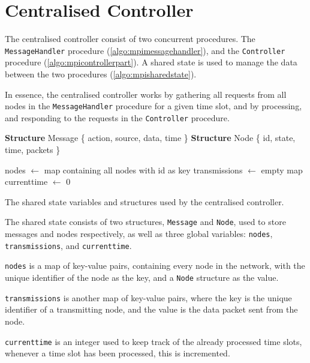 \section{Centralised Controller}\label{sec:mpicontroller}
The centralised controller consist of two concurrent procedures. The \texttt{MessageHandler} procedure (\autoref{algo:mpimessagehandler}), and the \texttt{Controller} procedure (\autoref{algo:mpicontrollerpart}). A shared state is used to manage the data between the two procedures (\autoref{algo:mpisharedstate}). \medbreak

In essence, the centralised controller works by gathering all requests from all nodes in the \texttt{MessageHandler} procedure for a given time slot, and by processing, and responding to the requests in the \texttt{Controller} procedure.

\begin{algorithm}[ht]
    \DontPrintSemicolon
    
    \textbf{Structure} Message \{ action, source, data, time \}\;
    \textbf{Structure} Node \{ id, state, time, packets \}\; %
    \;
    
    nodes $\leftarrow$ map containing all nodes with id as key\;
    transmissions $\leftarrow$ empty map\;
    currenttime $\leftarrow$ 0\;
 
    \caption{The shared state variables and structures used by the centralised controller.}
    \label{algo:mpisharedstate}
\end{algorithm}

The shared state consists of two structures, \texttt{Message} and \texttt{Node}, used to store messages and nodes respectively, as well as three global variables: \texttt{nodes}, \texttt{transmissions}, and \texttt{currenttime}. \smallbreak

\texttt{nodes} is a map of key-value pairs, containing every node in the network, with the unique identifier of the node as the key, and a \texttt{Node} structure as the value. \smallbreak

\texttt{transmissions} is another map of key-value pairs, where the key is the unique identifier of a transmitting node, and the value is the data packet sent from the node. \smallbreak

\texttt{currenttime} is an integer used to keep track of the already processed time slots, whenever a time slot has been processed, this is incremented.

